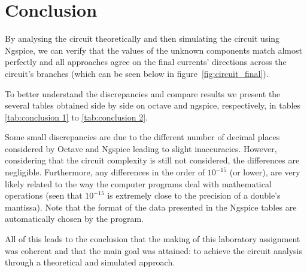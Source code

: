 \newpage
\section{Conclusion}
\label{sec:conclusion}

By analysing the circuit theoretically and then simulating the circuit using Ngspice, we can verify that the values of the unknown components match almost perfectly and all approaches agree on the final currents' directions across the circuit's branches (which can be seen below in figure~\ref{fig:circuit_final}).


To better understand the discrepancies and compare results we present the several tables obtained side by side on octave and ngspice, respectively, in tables \ref{tab:conclusion 1} to \ref{tab:conclusion 2}.





Some small discrepancies are due to the different number of decimal places considered by Octave and Ngspice leading to slight inaccuracies. However, considering that the circuit complexity is still not considered, the differences are negligible. Furthermore, any differences in the order of $10^{-15}$ (or lower), are very likely related to the way the computer programs deal with mathematical operations (seen that $10^{-15}$ is extremely close to the precision of a double's mantissa). Note that the format of the data presented in the Ngspice tables are automatically chosen by the program.

All of this leads to the conclusion that the making of this laboratory assignment was coherent and that the main goal was attained: to achieve the circuit analysis through a theoretical and simulated approach.
